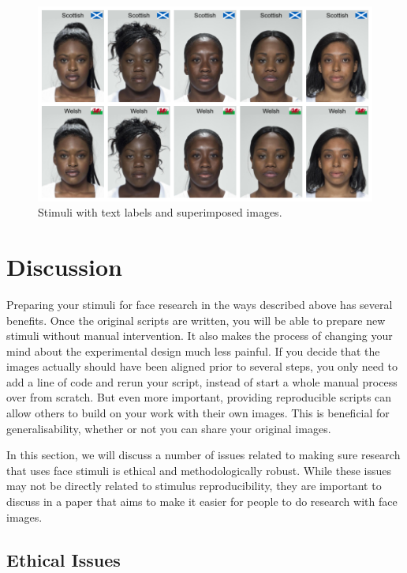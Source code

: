 \documentclass[
  man,floatsintext]{apa6}
\begin{document}
\begin{figure}
\includegraphics[width=1\linewidth]{index_files/figure-latex/label-comp-1} \caption{Stimuli with text labels and superimposed images.}\label{fig:label-comp}
\end{figure}

\hypertarget{discussion}{%
\section{Discussion}\label{discussion}}

Preparing your stimuli for face research in the ways described above has several benefits. Once the original scripts are written, you will be able to prepare new stimuli without manual intervention. It also makes the process of changing your mind about the experimental design much less painful. If you decide that the images actually should have been aligned prior to several steps, you only need to add a line of code and rerun your script, instead of start a whole manual process over from scratch. But even more important, providing reproducible scripts can allow others to build on your work with their own images. This is beneficial for generalisability, whether or not you can share your original images.

In this section, we will discuss a number of issues related to making sure research that uses face stimuli is ethical and methodologically robust. While these issues may not be directly related to stimulus reproducibility, they are important to discuss in a paper that aims to make it easier for people to do research with face images.

\hypertarget{ethical-issues}{%
\subsection{Ethical Issues}\label{ethical-issues}}
\end{document}
